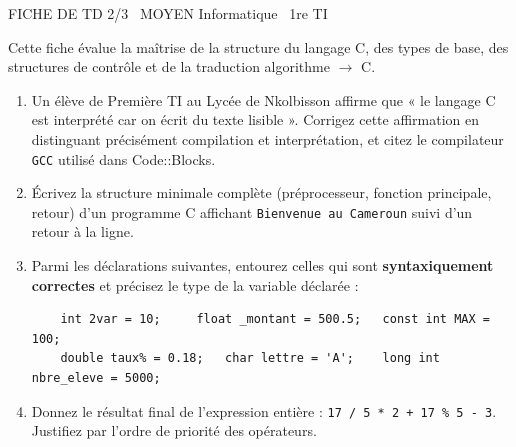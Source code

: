 \documentclass[11pt]{article}
\begin{document}
\begin{tcolorbox}[enhanced,colback=popink,colframe=popink,arc=10pt,boxrule=0pt,left=12pt,right=12pt,top=9pt,bottom=9pt]
{\color{white}\popxbold\small FICHE DE TD 2/3 \textbullet\ MOYEN \hfill Informatique \textbullet\ 1re TI\par}
\end{tcolorbox}
\vspace{4pt}
Cette fiche évalue la maîtrise de la structure du langage C, des types de base, des structures de contrôle et de la traduction algorithme $\to$ C.

\begin{exercice}
\begin{enumerate}
    \item Un élève de Première TI au Lycée de Nkolbisson affirme que « le langage C est interprété car on écrit du texte lisible ». Corrigez cette affirmation en distinguant précisément compilation et interprétation, et citez le compilateur \texttt{GCC} utilisé dans Code::Blocks.
    \item Écrivez la structure minimale complète (préprocesseur, fonction principale, retour) d'un programme C affichant \texttt{Bienvenue au Cameroun} suivi d'un retour à la ligne.
    \item Parmi les déclarations suivantes, entourez celles qui sont \textbf{syntaxiquement correctes} et précisez le type de la variable déclarée :
    \begin{verbatim}
    int 2var = 10;     float _montant = 500.5;   const int MAX = 100;
    double taux% = 0.18;   char lettre = 'A';    long int nbre_eleve = 5000;
    \end{verbatim}
    \item Donnez le résultat final de l'expression entière : \texttt{17 / 5 * 2 + 17 \% 5 - 3}. Justifiez par l'ordre de priorité des opérateurs.
\end{enumerate}
\end{exercice}
\end{document}
